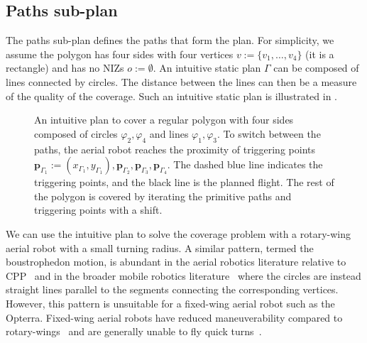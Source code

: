 \subsection{Paths sub-plan}
\label{sec:path-wise}

The paths sub-plan defines the paths that form the plan. For simplicity, we assume the polygon has four sides with four vertices $v:=\{v_1,\dots,v_4\}$ (it is a rectangle) and has no NIZs $o:=\emptyset$. An intuitive static plan $\Gamma$ can be composed of lines connected by circles. The distance between the lines can then be a measure of the quality of the coverage. Such an intuitive static plan is illustrated in .

\begin{figure}[ht!]
  \centering
  
  \caption[Boustrophedon-like motion to cover a regular polygon with four sides]{An intuitive plan to cover a regular polygon with four sides composed of circles $\varphi_2,\varphi_4$ and lines $\varphi_1,\varphi_3$. To switch between the paths, the aerial robot reaches the proximity of triggering points $\mathbf{p}_{\Gamma_1}:=(x_{\Gamma_1},y_{\Gamma_1}),\mathbf{p}_{\Gamma_2},\mathbf{p}_{\Gamma_3},\mathbf{p}_{\Gamma_4}$. The dashed blue line indicates the triggering points, and the black line is the planned flight. The rest of the polygon is covered by iterating the primitive paths and triggering points with a shift.}
  \label{fig:bm-like_pb}
\end{figure}

We can use the intuitive plan to solve the coverage problem with a rotary-wing aerial robot with a small turning radius. A similar pattern, termed the boustrophedon motion, is abundant in the aerial robotics literature relative to CPP~\citep{difranco2015energy,araujo2013multiple,artemenko2016energy,cabreira2018energy} and in the broader mobile robotics literature~\citep{choset2005principles,lavalle2006planning,choset2001coverage} where the circles are instead straight lines parallel to the segments connecting the corresponding vertices. However, this pattern is unsuitable for a fixed-wing aerial robot such as the Opterra. Fixed-wing aerial robots have reduced maneuverability compared to rotary-wings~\citep{dille2013efficient,mannadiar2010optimal,xu2011optimal,xu2014efficient} and are generally unable to fly quick turns~\citep{wang2017curvature}.

